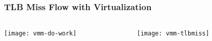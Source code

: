 \begin{frame}
	\frametitle{TLB Miss Flow with Virtualization}
	
	
	
	\begin{columns}
		
		\begin{column}{.2\textwidth}
			\centering
			\texttt{[image: vmm-do-work]}
			
		\end{column}
		
		\begin{column}{.8\textwidth}
			
			
			\centering
			\texttt{[image: vmm-tlbmiss]}	
			
			
			
			
		\end{column}
		
		
	\end{columns}
	
	
\end{frame}

